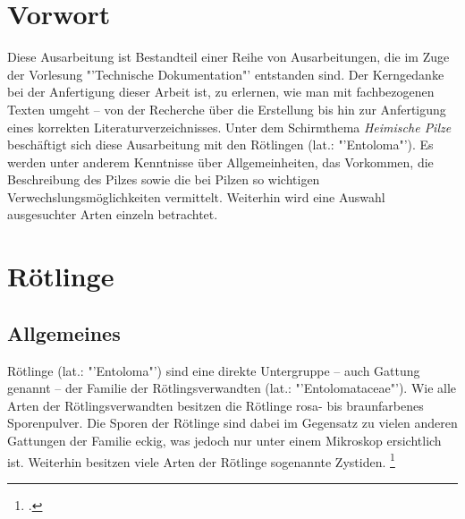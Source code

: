 \documentclass[a4paper,abstracton]{scrreprt}
\begin{document}


\tableofcontents
\listoffigures

\begin{abstract}
\begin{quote}%
Diese Arbeit befasst sich mit der Beschreibung einer Pilzgattung in der Ordnung der Champignonartigen, in der Familie der Rötlingsverwandten. Es handelt sich dabei um die sogenannten \emph{Rötlinge -- lateinisch Entoloma --}. 
\end{quote} 
\end{abstract}

\chapter{Vorwort}
Diese Ausarbeitung ist Bestandteil einer Reihe von Ausarbeitungen, die im Zuge der Vorlesung "'Technische Dokumentation"' entstanden sind. Der Kerngedanke bei der Anfertigung dieser Arbeit ist, zu erlernen, wie man mit fachbezogenen Texten umgeht -- von der Recherche über die Erstellung bis hin zur Anfertigung eines korrekten Literaturverzeichnisses. Unter dem Schirmthema \emph{Heimische Pilze} beschäftigt sich diese Ausarbeitung mit den Rötlingen (lat.: "'Entoloma"'). Es werden unter anderem Kenntnisse über Allgemeinheiten, das Vorkommen, die Beschreibung des Pilzes sowie die bei Pilzen so wichtigen Verwechslungsmöglichkeiten vermittelt. Weiterhin wird eine Auswahl ausgesuchter Arten einzeln betrachtet.
\chapter{Rötlinge}
\section{Allgemeines}
Rötlinge (lat.: "'Entoloma"') sind eine direkte Untergruppe -- auch Gattung genannt -- der Familie der Rötlingsverwandten (lat.: "'Entolomataceae"'). Wie alle Arten der Rötlingsverwandten besitzen die Rötlinge rosa- bis braunfarbenes Sporenpulver. Die Sporen der Rötlinge sind dabei im Gegensatz zu vielen anderen Gattungen der Familie eckig, was jedoch nur unter einem Mikroskop ersichtlich ist. Weiterhin besitzen viele Arten der Rötlinge sogenannte Zystiden. \footcite{entoloma}
\end{document}
